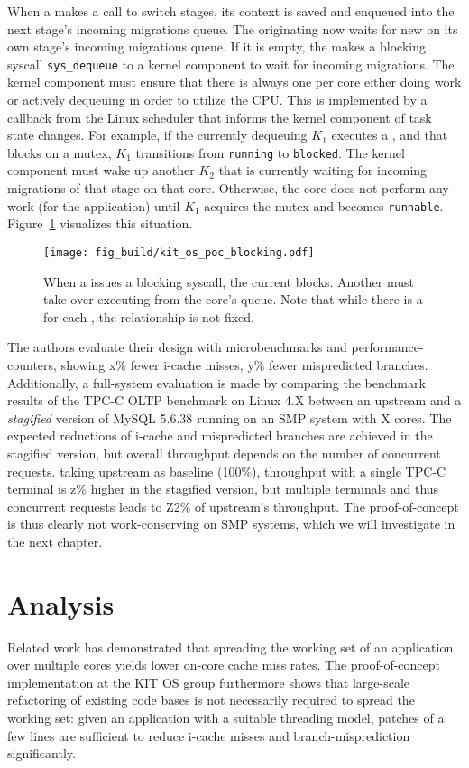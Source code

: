 \documentclass[12pt,a4paper]{book}
\begin{document}
When a \ult makes a call to switch stages, its context is saved and enqueued into the next stage's incoming migrations queue.
The originating \klt now waits for new \ults on its own stage's incoming migrations queue.
If it is empty, the \klt makes a blocking syscall \texttt{sys\_dequeue} to a kernel component to wait for incoming migrations.
The kernel component must ensure that there is always one \klt per core either doing work or actively dequeuing \ults in order to utilize the CPU.
This is implemented by a callback from the Linux scheduler that informs the kernel component of task state changes.
For example, if the currently dequeuing \klt $K_1$ executes a \ult, and that \ult blocks on a mutex, $K_1$ transitions from \texttt{running} to \texttt{blocked}.
The kernel component must wake up another \klt $K_2$ that is currently waiting for incoming migrations of that stage on that core.
Otherwise, the core does not perform any work (for the application) until $K_1$ acquires the mutex and becomes \texttt{runnable}.
Figure~\ref{fig:kit_os_poc_blocking} visualizes this situation.

\begin{figure}[h]
    \centering
    \texttt{[image: fig\_build/kit\_os\_poc\_blocking.pdf]}
    \caption{When a \ult issues a blocking syscall, the current \klt blocks. Another \klt must take over executing \ults from the core's queue. Note that while there is a \klt for each \ult, the relationship is not fixed.}
    \label{fig:kit_os_poc_blocking}
\end{figure}

The authors evaluate their design with microbenchmarks and performance-counters, showing x\% fewer i-cache misses, y\% fewer mispredicted branches.
Additionally, a full-system evaluation is made by comparing the benchmark results of the TPC-C OLTP benchmark on Linux 4.X between an upstream and a \emph{stagified} version of MySQL 5.6.38 running on an SMP system with X cores.
The expected reductions of i-cache and mispredicted branches are achieved in the stagified version, but overall throughput depends on the number of concurrent requests.
taking upstream as baseline (100\%), throughput with a single TPC-C terminal is z\% higher in the stagified version, but multiple terminals and thus concurrent requests leads to Z2\% of upstream's throughput.
The proof-of-concept is thus clearly not work-conserving on SMP systems, which we will investigate in the next chapter.

\chapter{Analysis}\label{ch:analysis}
Related work has demonstrated that spreading the working set of an application over multiple cores yields lower on-core cache miss rates.
The proof-of-concept implementation at the KIT OS group furthermore shows that large-scale refactoring of existing code bases is not necessarily required to spread the working set:
given an application with a suitable threading model, patches of a few lines are sufficient to reduce i-cache misses and branch-misprediction significantly.
\end{document}
